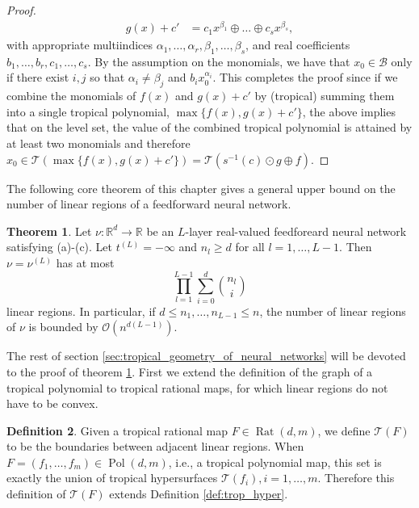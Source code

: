 \documentclass{article}
\theoremstyle{definition}
\newtheorem{theorem}{Theorem}[section]
\newtheorem{definition}[theorem]{Definition}
\DeclareMathOperator{\Rat}{Rat}
\DeclareMathOperator{\Pol}{Pol}
\begin{document}
\begin{proof}
\begin{align*}
g(x) + c' &= c_1 x^{\beta_1} \oplus \dots \oplus c_s x^{\beta_s},
\end{align*}
with appropriate multiindices $\alpha_1 , \dots , \alpha_r, \beta_1 , \dots , \beta_s$, and real coefficients $b_1, \dots , b_r, c_1, \dots , c_s$. By the assumption on
the monomials, we have that $x_0 \in \mathcal{B} $ only if there exist $i, j$ so that $\alpha_i \neq \beta_j$ and $b_i x_0^{\alpha_i}$. This completes the proof since if we combine the monomials of $f(x)$ and $g(x) + c'$ by (tropical) summing them into a single tropical polynomial, $\max \{f(x), g(x) + c'\}$, the above implies that on the level set, the value of the combined tropical polynomial is attained by at least two monomials and therefore $x_0 \in \mathcal{T}(\max\{f(x), g(x) + c'\}) = \mathcal{T} (s^{-1}(c) \odot g \oplus f)$.
\end{proof}
The following core theorem of this chapter gives a general upper bound on the number of linear regions of a feedforward neural network.
\begin{theorem}\hspace{1sp}\cite[p.~8]{zhang2018tropical}
\label{theo:lin_reg}
Let $\nu : \mathbb{R}^{d} \to \mathbb{R}$ be an $L$-layer real-valued feedforeard neural network satisfying (a)-(c). Let $t^{(L)}=-\infty$ and $n_{l} \geq d$ for all $l=1, \dots , L-1$. Then $\nu = \nu^{(L)}$ has at most
$$\displaystyle\prod^{L-1}_{l=1}\displaystyle\sum^{d}_{i=0}\binom{n_l}{i}$$
linear regions. In particular, if $d \leq n_1, \dots , n_{L-1} \leq n$, the number of linear regions of $\nu$ is bounded by $\mathcal{O}(n^{d(L-1)})$.
\end{theorem}

The rest of section \ref{sec:tropical_geometry_of_neural_networks} will be devoted to the proof of theorem \ref{theo:lin_reg}. First we extend the definition of the graph of a tropical polynomial to tropical rational maps, for which linear regions do not have to be convex.

\begin{definition}\hspace{1sp}\cite[p.~15]{zhang2018tropical}
Given a tropical rational map $F \in \Rat(d, m)$, we define $\mathcal{T}(F)$ to be the boundaries between adjacent linear regions. When $F=(f_1, \dots , f_m) \in \Pol(d, m)$, i.e., a tropical polynomial map, this set is exactly the union of tropical hypersurfaces $\mathcal{T}(f_i), i=1, \dots , m$. Therefore this definition of $\mathcal{T}(F)$ extends Definition \ref{def:trop_hyper}.
\end{definition}
\end{document}
